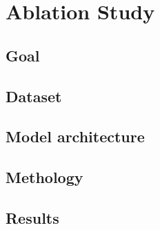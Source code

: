 \documentclass[conference]{IEEEtran}
\begin{document}
\section{Ablation Study}
\subsection{Goal}
\subsection{Dataset}
\subsection{Model architecture}
\subsection{Methology}
\subsection{Results}





%
%

\end{document}

